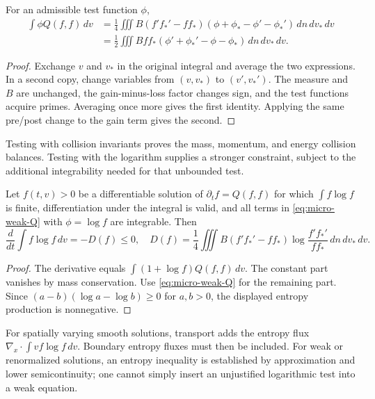 \begin{proposition}
\label{prop:micro-weak-Q}
For an admissible test function $\phi$,
\begin{align}
 \int\phi Q(f,f)\,dv
 &=\frac14\iiint B(f'f_*'-ff_*)
       (\phi+\phi_* -\phi'-\phi_*')\,dn\,dv_*\,dv
       \label{eq:micro-weak-Q}\\
 &=\frac12\iiint Bff_*
       (\phi'+\phi_*'-\phi-\phi_*)\,dn\,dv_*\,dv.
       \nonumber
\end{align}
\end{proposition}
\begin{proof}
Exchange $v$ and $v_*$ in the original integral and average the
two expressions.  In a second copy, change variables from
$(v,v_*)$ to $(v',v_*')$.  The measure and $B$ are unchanged,
the gain-minus-loss factor changes sign, and the test functions
acquire primes.  Averaging once more gives the first identity.
Applying the same pre/post change to the gain term gives the second.
\end{proof}

Testing with collision invariants proves the mass, momentum, and energy
collision balances.  Testing with the logarithm supplies a stronger
constraint, subject to the additional integrability needed for that
unbounded test.

\begin{theorem}
\label{thm:micro-H}
Let $f(t,v)>0$ be a differentiable solution of
$\partial_tf=Q(f,f)$ for which $\int f\log f$ is finite,
differentiation under the integral is valid, and all terms in
\eqref{eq:micro-weak-Q} with $\phi=\log f$ are integrable.
Then
\begin{equation}
 \frac{d}{dt}\int f\log f\,dv=-D(f)\le0,
 \quad
 D(f)=\frac14\iiint B(f'f_*'-ff_*)
           \log\frac{f'f_*'}{ff_*}\,dn\,dv_*\,dv.
 \label{eq:micro-H}
\end{equation}
\end{theorem}
\begin{proof}
The derivative equals $\int(1+\log f)Q(f,f)\,dv$.
The constant part vanishes by mass conservation.  Use
\eqref{eq:micro-weak-Q} for the remaining part.  Since
$(a-b)(\log a-\log b)\ge0$ for $a,b>0$, the displayed
entropy production is nonnegative.
\end{proof}

For spatially varying smooth solutions, transport adds the entropy flux
$\nabla_x\cdot\int vf\log f\,dv$.  Boundary entropy fluxes must
then be included.  For weak or renormalized solutions, an entropy
inequality is established by approximation and lower semicontinuity;
one cannot simply insert an unjustified logarithmic test into a weak
equation.


